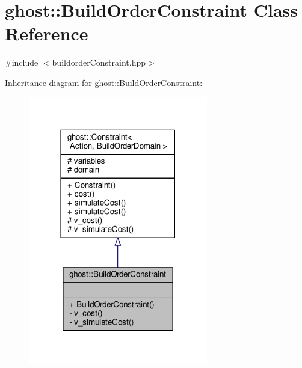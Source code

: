 \hypertarget{classghost_1_1BuildOrderConstraint}{\section{ghost\-:\-:Build\-Order\-Constraint Class Reference}
\label{classghost_1_1BuildOrderConstraint}
}


{\ttfamily \#include $<$buildorder\-Constraint.\-hpp$>$}



Inheritance diagram for ghost\-:\-:Build\-Order\-Constraint\-:\nopagebreak
\begin{figure}[H]
\begin{center}
\leavevmode
\includegraphics[width=222pt]{classghost_1_1BuildOrderConstraint__inherit__graph}
\end{center}
\end{figure}


